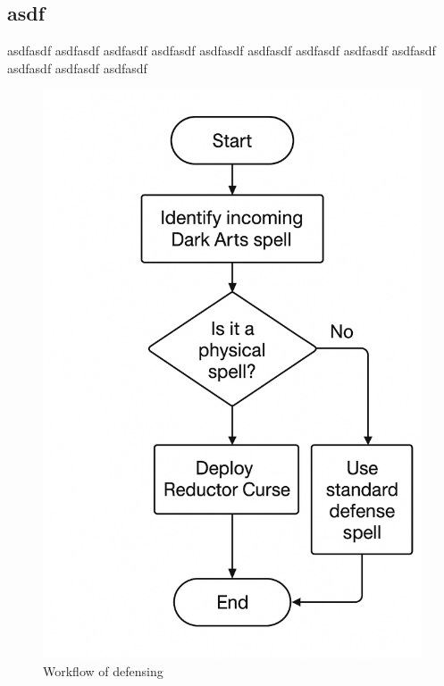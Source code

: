 \subsection{asdf}
asdfasdf asdfasdf asdfasdf asdfasdf asdfasdf asdfasdf asdfasdf asdfasdf asdfasdf asdfasdf asdfasdf asdfasdf



\begin{figure}
    \centering
    \includegraphics[width=0.5\linewidth]{images/workflow.png}
    \caption{Workflow of defensing}
    \label{fig:fig1}
\end{figure}
